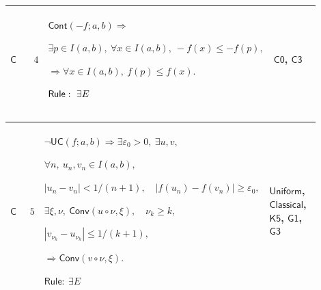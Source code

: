 \documentclass[12pt,reqno]{amsart}
\theoremstyle{blueplain}
\numberwithin{equation}{section}
\begin{document}
{\scriptsize \setlength{\parskip}{0pt}\nointerlineskip
\noindent 
\begin{tabular}{|@{}>{\centering\arraybackslash}m{0.10658\linewidth}|>{\centering\arraybackslash}m{0.03553\linewidth}|>{\centering\arraybackslash}m{0.52105\linewidth}|>{\centering\arraybackslash}m{0.23684\linewidth}|}
\hline
\hypertarget{proof:C4}{$\displaystyle \mathsf{C}$} & $\displaystyle 4$ & $%
\displaystyle \mathsf{Cont}(-f;a,b)\Rightarrow$\par$\displaystyle \exists
p\in I(a,b),\ \forall x\in I(a,b),\ -f(x)\le-f(p),$\par$\displaystyle %
\Rightarrow\forall x\in I(a,b),\ f(p)\le f(x).$\par$\displaystyle \mathsf{%
Rule}:\ \exists E$ & \hyperlink{proof:C0}{$\displaystyle \mathsf{C0}$}, 
\hyperlink{proof:C3}{$\displaystyle \mathsf{C3}$} \\ \hline
\end{tabular}%
}

{\scriptsize \setlength{\parskip}{0pt}\nointerlineskip
\noindent 
\begin{tabular}{|@{}>{\centering\arraybackslash}m{0.10658\linewidth}|>{\centering\arraybackslash}m{0.03553\linewidth}|>{\centering\arraybackslash}m{0.52105\linewidth}|>{\centering\arraybackslash}m{0.23684\linewidth}|}
\hline
\hypertarget{proof:C5}{$\displaystyle \mathsf{C}$} & $\displaystyle 5$ & $%
\displaystyle \neg\mathsf{UC}(f;a,b)\Rightarrow\exists\varepsilon_0>0,\
\exists u,v,$\par$\displaystyle \forall n,\ u_n,v_n\in I(a,b),$\par$%
\displaystyle |u_n-v_n|<1/(n+1),\quad|f(u_n)-f(v_n)|\ge\varepsilon_0,$\par$%
\displaystyle \exists\xi,\nu,\ \mathsf{Conv}(u\circ\nu,\xi),\quad\nu_k\ge k,$%
\par$\displaystyle |v_{\nu_k}-u_{\nu_k}|\le1/(k+1),$\par$\displaystyle %
\Rightarrow\mathsf{Conv}(v\circ\nu,\xi).$\par$\displaystyle \mathsf{Rule}:\
\exists E$ & \hyperlink{def:Uniform}{$\displaystyle \mathsf{Uniform}$}, 
\hyperlink{ax:Classical}{$\displaystyle \mathsf{Classical}$}, \hyperlink{proof:K5}%
{$\displaystyle \mathsf{K5}$}, \hyperlink{proof:G1}{$\displaystyle \mathsf{G1%
}$}, \hyperlink{proof:G3}{$\displaystyle \mathsf{G3}$} \\ \hline
\end{tabular}%
}
\end{document}
